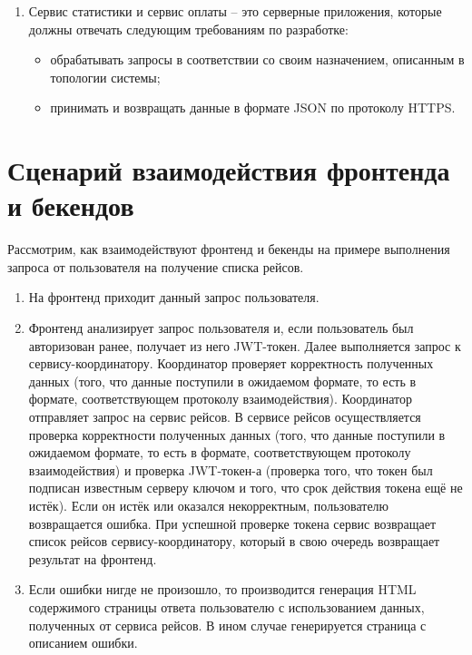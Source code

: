 \begin{enumerate}
\begin{itemize}
        \item существовать в нескольких экземплярах, чтобы координация запросов не была узким местом приложения;
        \item уведомлять сервис статистики о событиях в системем.
    \end{itemize}
    \item Сервис статистики и сервис оплаты -- это серверные приложения, которые должны отвечать следующим требованиям по разработке:
    \begin{itemize}
        \item обрабатывать запросы в соответствии со своим назначением, описанным в топологии системы;
        \item принимать и возвращать данные в формате JSON по протоколу HTTPS.
    \end{itemize}
\end{enumerate}

\section*{Сценарий взаимодействия фронтенда и бекендов}

Рассмотрим, как взаимодействуют фронтенд и бекенды на примере выполнения запроса от пользователя на получение списка рейсов.

\begin{enumerate}
    \item На фронтенд приходит данный запрос пользователя.
    \item Фронтенд анализирует запрос пользователя и, если пользователь был авторизован ранее, получает из него JWT-токен. Далее выполняется запрос к сервису-координатору. Координатор проверяет корректность полученных данных (того, что данные поступили в ожидаемом формате, то есть в формате, соответствующем протоколу взаимодействия). Координатор отправляет запрос на сервис рейсов. В сервисе рейсов осуществляется проверка корректности полученных данных (того, что данные поступили в ожидаемом формате, то есть в формате, соответствующем протоколу взаимодействия) и проверка JWT-токен-а (проверка того, что токен был подписан известным серверу ключом и того, что срок действия токена ещё не истёк). Если он истёк или оказался некорректным, пользователю возвращается ошибка. При успешной проверке токена сервис возвращает список рейсов сервису-координатору, который в свою очередь возвращает результат на фронтенд.
    \item Если ошибки нигде не произошло, то производится генерация HTML содержимого страницы ответа пользователю с использованием данных, полученных от сервиса рейсов. В ином случае генерируется страница с описанием ошибки.
\end{enumerate}

